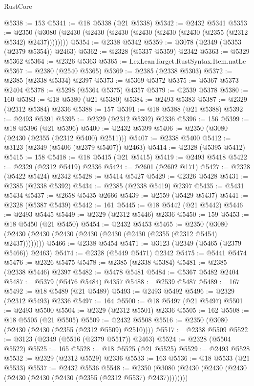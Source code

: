 \begin{lexlean}{RustCore}
\begin{coremodule}
@5338 := 153
@5341 := @18 @5338 (@21 @5338)
@5342 := @2432 @5341
@5353 := @2350 (@3080 (@2430 (@2430 (@2430 (@2430 (@2430 (@2430 (@2355 (@2312 @5342) @2437))))))))
@5354 := @2338 @5342
@5359 := @3078 (@2349 (@5353 (@2379 @5354)) @2463)
@5362 := @2328 (@5337 @5359) @2342
@5363 := @5329 @5362
@5364 := @2326 @5363
@5365 := LexLeanTarget.RustSyntax.Item.natLe
@5367 := @2380 (@2540 @5365)
@5369 := @2385 (@2338 @5303)
@5372 := @2385 (@2338 @5334) @2397
@5373 := @5369 @5372
@5375 := @5367 @5373 @2404
@5378 := @5298 (@5364 @5375) @4357
@5379 := @2539 @5378
@5380 := 160
@5383 := @18 @5380 (@21 @5380)
@5384 := @2493 @5383
@5387 := @2329 (@2312 @5384) @2336
@5388 := 157
@5391 := @18 @5388 (@21 @5388)
@5392 := @2493 @5391
@5395 := @2329 (@2312 @5392) @2336
@5396 := 156
@5399 := @18 @5396 (@21 @5396)
@5400 := @2432 @5399
@5406 := @2350 (@3080 (@2430 (@2355 (@2312 @5400) @2511)))
@5407 := @2338 @5400
@5412 := @3123 (@2349 (@5406 (@2379 @5407)) @2463)
@5414 := @2328 (@5395 @5412)
@5415 := 158
@5418 := @18 @5415 (@21 @5415)
@5419 := @2493 @5418
@5422 := @2329 (@2312 @5419) @2336
@5424 := @2601 (@2602 @171)
@5427 := @2328 (@5422 @5424) @2342
@5428 := @5414 @5427
@5429 := @2326 @5428
@5431 := @2385 (@2338 @5392)
@5434 := @2385 (@2338 @5419) @2397
@5435 := @5431 @5434
@5437 := @2658 @5435 @2666
@5439 := @2559 (@5429 @5437)
@5441 := @2328 (@5387 @5439)
@5442 := 161
@5445 := @18 @5442 (@21 @5442)
@5446 := @2493 @5445
@5449 := @2329 (@2312 @5446) @2336
@5450 := 159
@5453 := @18 @5450 (@21 @5450)
@5454 := @2432 @5453
@5465 := @2350 (@3080 (@2430 (@2430 (@2430 (@2430 (@2430 (@2430 (@2355 (@2312 @5454) @2437))))))))
@5466 := @2338 @5454
@5471 := @3123 (@2349 (@5465 (@2379 @5466)) @2463)
@5474 := @2328 (@5449 @5471) @2342
@5475 := @5441 @5474
@5476 := @2326 @5475
@5478 := @2385 (@2338 @5384)
@5481 := @2385 (@2338 @5446) @2397
@5482 := @5478 @5481
@5484 := @5367 @5482 @2404
@5487 := @5379 (@5476 @5484) @4357
@5488 := @2539 @5487
@5489 := 167
@5492 := @18 @5489 (@21 @5489)
@5493 := @2493 @5492
@5496 := @2329 (@2312 @5493) @2336
@5497 := 164
@5500 := @18 @5497 (@21 @5497)
@5501 := @2493 @5500
@5504 := @2329 (@2312 @5501) @2336
@5505 := 162
@5508 := @18 @5505 (@21 @5505)
@5509 := @2432 @5508
@5516 := @2350 (@3080 (@2430 (@2430 (@2355 (@2312 @5509) @2510))))
@5517 := @2338 @5509
@5522 := @3123 (@2349 (@5516 (@2379 @5517)) @2463)
@5524 := @2328 (@5504 @5522)
@5525 := 165
@5528 := @18 @5525 (@21 @5525)
@5529 := @2493 @5528
@5532 := @2329 (@2312 @5529) @2336
@5533 := 163
@5536 := @18 @5533 (@21 @5533)
@5537 := @2432 @5536
@5548 := @2350 (@3080 (@2430 (@2430 (@2430 (@2430 (@2430 (@2430 (@2355 (@2312 @5537) @2437))))))))

\end{coremodule}
\end{lexlean}
